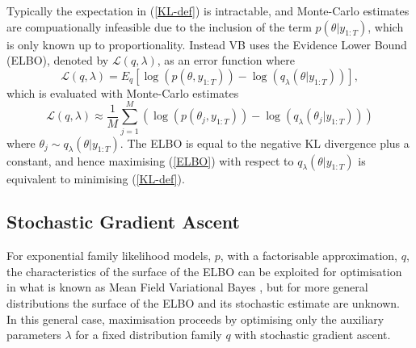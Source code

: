 \documentclass[12pt,a4paper]{article}\usepackage[]{graphicx}\usepackage[]{color}
\begin{document}
Typically the expectation in (\ref{KL-def}) is intractable, and Monte-Carlo estimates are compuationally infeasible due to the inclusion of the term $p(\theta | y_{1:T})$, which is only known up to proportionality. Instead VB uses the Evidence Lower Bound (ELBO), denoted by $\mathcal{L}(q, \lambda)$, as an error function where
\begin{equation}
\label{ELBO}
\mathcal{L}(q, \lambda) = E_q \left[\log(p(\theta, y_{1:T})) - \log(q_{\lambda}(\theta | y_{1:T}))\right],
\end{equation}
which is evaluated with Monte-Carlo estimates
\begin{equation}
\label{ELBO-MC}
\mathcal{L}(q, \lambda) \approx \frac{1}{M} \sum_{j=1}^M \left(\log(p(\theta_{j}, y_{1:T})) - \log(q_{\lambda}(\theta_{j} | y_{1:T})) \right)
\end{equation}
where $\theta_{j} \sim q_{\lambda}(\theta | y_{1:T})$. The ELBO is equal to the negative KL divergence plus a constant, and hence maximising (\ref{ELBO}) with respect to $q_{\lambda}(\theta | y_{1:T})$ is equivalent to minimising (\ref{KL-def}).

\subsection{Stochastic Gradient Ascent}
\label{subsec:SGA}
For exponential family likelihood models, $p$, with a factorisable approximation, $q$, the characteristics of the surface of the ELBO can be exploited for optimisation in what is known as Mean Field Variational Bayes \citep{Jordan1999, Ghahramani2000a, Wainwright2008}, but for more general distributions the surface of the ELBO and its stochastic estimate are unknown. In this general case, maximisation proceeds by optimising only the auxiliary parameters $\lambda$ for a fixed distribution family $q$ with stochastic gradient ascent.
\\
\end{document}
